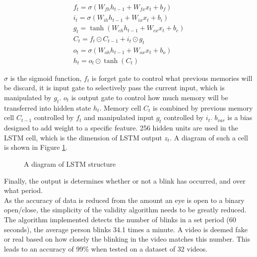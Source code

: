 \documentclass{article}
\begin{document}
\begin{equation}
\begin{array}{l}
    f_t = \sigma \left( W_{fh} h_{t-1} + W_{fx} x_t + b _f \right) \\
    i_t = \sigma \left( W_{ih} h_{t-1} + W_{ix} x_t + b_i \right) \\
    g_t = \tanh \left( W_{ch} h_{t-1} + W_{cx} x_t + b_c \right) \\
    C_t = f_t \odot C_{t-1} + i_t \odot g_t \\
    o_t = \sigma \left( W_{oh} h_{t-1} + W_{ox} x_t + b_o \right) \\
    h_t = o_t \odot \tanh \left( C_t \right)
\end{array}
\end{equation}

$\sigma$ is the sigmoid function, $f_t$ is forget gate to control what previous memories will be discard, it is input gate to selectively pass the current input, which is manipulated by $g_t$. $o_t$ is output gate to control how much memory will be transferred into hidden state $h_t$. Memory cell $C_t$ is combined by previous memory cell $C_{t-1}$ controlled by $f_t$ and manipulated input $g_t$ controlled by $i_t$. $b_{var}$ is a bias designed to add weight to a specific feature. 256 hidden units are used in the LSTM cell, which is the dimension of LSTM output $z_t$\cite{ictuoculi}. A diagram of such a cell is shown in Figure \ref{fig:LSTM}.

\begin{figure}[H]
    \centering
    \caption{A diagram of LSTM structure\cite{ictuoculi}}
    \label{fig:LSTM}
\end{figure}

Finally, the output is determines whether or not a blink has occurred, and over what period.\\

As the accuracy of data is reduced from the amount an eye is open to a binary open/close, the simplicity of the validity algorithm needs to be greatly reduced. The algorithm implemented detects the number of blinks in a set period (60 seconds), the average person blinks 34.1 times a minute. A video is deemed fake or real based on how closely the blinking in the video matches this number. This leads to an accuracy of 99\% when tested on a dataset of 32 videos.
\end{document}
